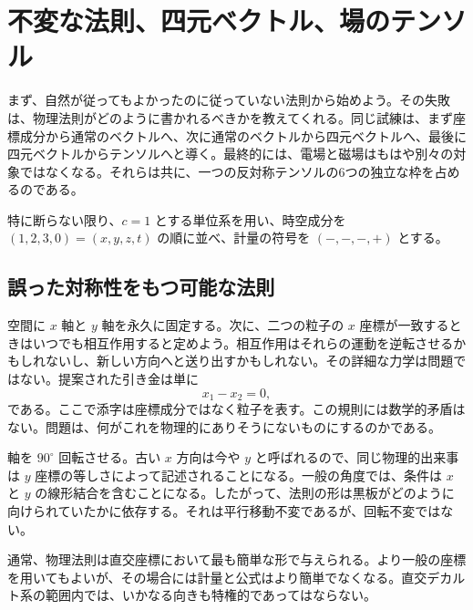 \chapter{不変な法則、四元ベクトル、場のテンソル}

まず、自然が従ってもよかったのに従っていない法則から始めよう。その失敗は、物理法則がどのように書かれるべきかを教えてくれる。同じ試練は、まず座標成分から通常のベクトルへ、次に通常のベクトルから四元ベクトルへ、最後に四元ベクトルからテンソルへと導く。最終的には、電場と磁場はもはや別々の対象ではなくなる。それらは共に、一つの反対称テンソルの6つの独立な枠を占めるのである。

特に断らない限り、\(c=1\) とする単位系を用い、時空成分を \((1,2,3,0)=(x,y,z,t)\) の順に並べ、計量の符号を \((-,-,-,+)\) とする。

\section{誤った対称性をもつ可能な法則}

空間に \(x\) 軸と \(y\) 軸を永久に固定する。次に、二つの粒子の \(x\) 座標が一致するときはいつでも相互作用すると定めよう。相互作用はそれらの運動を逆転させるかもしれないし、新しい方向へと送り出すかもしれない。その詳細な力学は問題ではない。提案された引き金は単に
\begin{equation}
  x_1-x_2=0,
\end{equation}
である。ここで添字は座標成分ではなく粒子を表す。この規則には数学的矛盾はない。問題は、何がこれを物理的にありそうにないものにするのかである。

\begin{classroomqa}
\end{classroomqa}

軸を \(90^\circ\) 回転させる。古い \(x\) 方向は今や \(y\) と呼ばれるので、同じ物理的出来事は \(y\) 座標の等しさによって記述されることになる。一般の角度では、条件は \(x\) と \(y\) の線形結合を含むことになる。したがって、法則の形は黒板がどのように向けられていたかに依存する。それは平行移動不変であるが、回転不変ではない。

通常、物理法則は直交座標において最も簡単な形で与えられる。より一般の座標を用いてもよいが、その場合には計量と公式はより簡単でなくなる。直交デカルト系の範囲内では、いかなる向きも特権的であってはならない。

